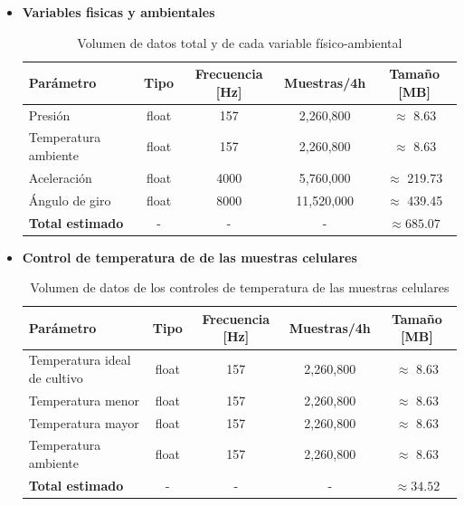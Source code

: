     \begin{itemize}

      \item \textbf{Variables fisicas y ambientales}

      \begin{table}[H]
      \centering
      \begin{tabular}{|l|c|c|c|c|}
      \hline
      \textbf{Parámetro} & \textbf{Tipo} & \textbf{Frecuencia [Hz]} & \textbf{Muestras/4h} & \textbf{Tamaño [MB]} \\
      \hline
      Presión               & float & 157   & 2,260,800  & $\approx$ 8.63     \\
      Temperatura ambiente  & float & 157   & 2,260,800  & $\approx$ 8.63     \\
      Aceleración           & float & 4000  & 5,760,000  & $\approx$ 219.73   \\
      Ángulo de giro        & float & 8000  & 11,520,000 & $\approx$ 439.45   \\
      \hline
      \textbf{Total estimado} & -    & -     & -         & $\boldsymbol{\approx 685.07}$ \\
      \hline
      \end{tabular}
      \caption{Volumen de datos total y de cada variable físico-ambiental}
      \label{tab:volumen_datos}
      \end{table}

      \item \textbf{Control de temperatura de de las muestras celulares}

      \begin{table}[H]
      \centering
      \begin{tabular}{|l|c|c|c|c|}
      \hline
      \textbf{Parámetro} & \textbf{Tipo} & \textbf{Frecuencia [Hz]} & \textbf{Muestras/4h} & \textbf{Tamaño [MB]} \\
      \hline
      Temperatura ideal de cultivo & float & 157 & 2,260,800 & $\approx$ 8.63 \\
      Temperatura menor            & float & 157 & 2,260,800 & $\approx$ 8.63 \\
      Temperatura mayor            & float & 157 & 2,260,800 & $\approx$ 8.63 \\
      Temperatura ambiente         & float & 157 & 2,260,800 & $\approx$ 8.63 \\
      \hline
      \textbf{Total estimado}      & -     & -   & -         & $\boldsymbol{\approx 34.52}$ \\
      \hline
      \end{tabular}
      \caption{Volumen de datos de los controles de temperatura de las muestras celulares}
      \label{tab:volumen_datos_temperatura}
      \end{table}


\end{itemize}
